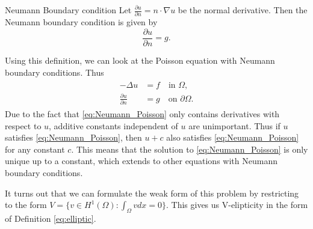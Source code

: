 

\begin{defn}{Neumann Boundary condition}
    Let $\frac{\partial u}{\partial n}= n\cdot \nabla u$ be the normal derivative. Then the Neumann boundary condition is given by
    \begin{equation}
        \frac{\partial u}{\partial n}  = g.
    \end{equation}
\end{defn}
Using this definition, we can look at the Poisson equation with Neumann boundary conditions. Thus
\begin{align}
\label{eq:Neumann_Poisson}
\begin{split}
    -\Delta u &= f \quad \text{in } \Omega, \\
    \frac{\partial u}{\partial n} &= g \quad \text{on } \partial \Omega.
\end{split}
\end{align}
Due to the fact that \eqref{eq:Neumann_Poisson} only contains derivatives with respect to $u$,
 additive constants independent of $u$ are unimportant.
Thus if $u$ satisfies \eqref{eq:Neumann_Poisson}, then $u + c$ also satisfies \eqref{eq:Neumann_Poisson} for any constant $c$.
This means that the solution to \eqref{eq:Neumann_Poisson} is only unique up to a constant,
 which extends to other equations with Neumann boundary conditions.

It turns out that we can formulate the weak form of this problem by restricting to the form $V=\{v\in H^1(\Omega):\int_{\Omega}vdx=0\}.$
This gives us V-elipticity in the form of Definition \eqref{eq:elliptic}. 


